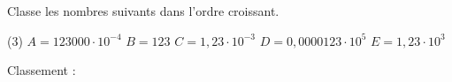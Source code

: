 %
%
Classe les nombres suivants dans l'ordre croissant.
	\begin{tasks}[label=\,](3)
		\task $A=123000\cdot 10^{-4}$
		\task $B=123$
		\task $C=1,23\cdot 10^{-3}$
		\task $D=0,0000123\cdot 10^5$
		\task $E=1,23\cdot 10^3$
	\end{tasks}

Classement :

